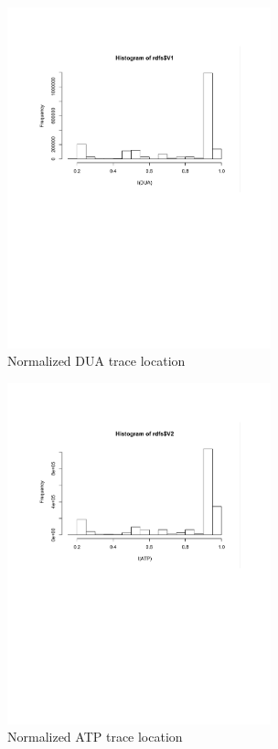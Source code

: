 \begin{figure}
\centering
\includegraphics[width=3in]{dua.pdf}
\caption{Normalized DUA trace location}
\label{fig:dua-hist}
\end{figure}

\begin{figure}
\centering
\includegraphics[width=3in]{atp.pdf}
\caption{Normalized ATP trace location}
\label{fig:atp-hist}
\end{figure}

